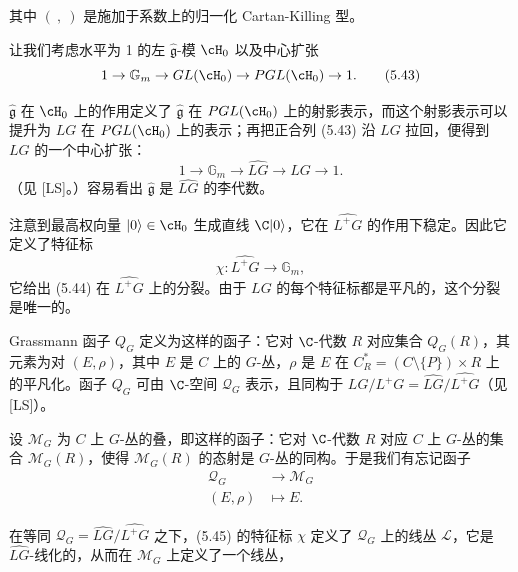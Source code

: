 其中 $(\ ,\ )$ 是施加于系数上的归一化 Cartan-Killing 型。

让我们考虑水平为 1 的左 $\hat{\mathfrak g}$-模 $\cH_0$ 以及中心扩张
\begin{equation}
 1\to\mathbb G_m\to GL(\cH_0)\to PGL(\cH_0)\to 1. \tag{5.43}
\end{equation}


$\hat{\mathfrak g}$ 在 $\cH_0$ 上的作用定义了 $\hat{\mathfrak g}$ 在 $PGL(\cH_0)$ 上的射影表示，而这个射影表示可以提升为 $LG$ 在 $PGL(\cH_0)$ 上的表示；再把正合列 (5.43) 沿 $LG$ 拉回，便得到 $LG$ 的一个中心扩张：
\begin{equation}
 1\to\mathbb G_m\to\widehat{LG}\to LG\to 1. \tag{5.44}
\end{equation}
（见 [LS]。）容易看出 $\hat{\mathfrak g}$ 是 $\widehat{LG}$ 的李代数。


注意到最高权向量 $|0\rangle\in\cH_0$ 生成直线 $\C|0\rangle$，它在 $\widehat{L^+G}$ 的作用下稳定。因此它定义了特征标
\begin{equation}
 \chi\colon\widehat{L^+G}\to\mathbb G_m, \tag{5.45}
\end{equation}
它给出 (5.44) 在 $\widehat{L^+G}$ 上的分裂。由于 $LG$ 的每个特征标都是平凡的，这个分裂是唯一的。


Grassmann 函子 $Q_G$ 定义为这样的函子：它对 $\C$-代数 $R$ 对应集合 $Q_G(R)$，其元素为对 $(E,\rho)$，其中 $E$ 是 $C$ 上的 $G$-丛，$\rho$ 是 $E$ 在 $C_R^*=(C\setminus\{P\})\times R$ 上的平凡化。函子 $Q_G$ 可由 $\C$-空间 $\mathcal Q_G$ 表示，且同构于 $LG/L^+G=\widehat{LG}/\widehat{L^+G}$（见 [LS]）。



设 $\mathcal M_G$ 为 $C$ 上 $G$-丛的叠，即这样的函子：它对 $\C$-代数 $R$ 对应 $C$ 上 $G$-丛的集合 $\mathcal M_G(R)$，使得 $\mathcal M_G(R)$ 的态射是 $G$-丛的同构。于是我们有忘记函子
\begin{align}
 \mathcal Q_G&\to\mathcal M_G \nonumber\\
 (E,\rho)&\mapsto E. \nonumber
\end{align}

在等同 $\mathcal Q_G=\widehat{LG}/\widehat{L^+G}$ 之下，(5.45) 的特征标 $\chi$ 定义了 $\mathcal Q_G$ 上的线丛 $\mathcal L$，它是 $\widehat{LG}$-线化的，从而在 $\mathcal M_G$ 上定义了一个线丛，

